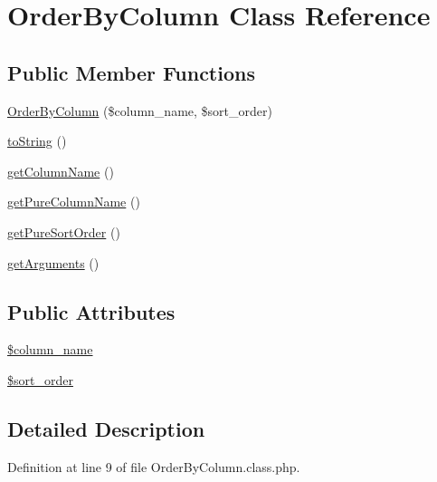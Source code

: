 \hypertarget{classOrderByColumn}{\section{Order\+By\+Column Class Reference}
\label{classOrderByColumn}
}
\subsection*{Public Member Functions}
\begin{DoxyCompactItemize}
\item 
\hyperlink{classOrderByColumn_a42a97dd505843873eb5cac1ea67e85a1}{Order\+By\+Column} (\$column\+\_\+name, \$sort\+\_\+order)
\item 
\hyperlink{classOrderByColumn_a6db0b86d7ed8ac3a9467ad9c2b70a022}{to\+String} ()
\item 
\hyperlink{classOrderByColumn_aa6e094dc084a79fa96a6cc529ac4431f}{get\+Column\+Name} ()
\item 
\hyperlink{classOrderByColumn_a11d8fa0bb15e4089d6cedde469f51aa7}{get\+Pure\+Column\+Name} ()
\item 
\hyperlink{classOrderByColumn_a7279ca2da1f1376de633eef931ff86ff}{get\+Pure\+Sort\+Order} ()
\item 
\hyperlink{classOrderByColumn_affbf2de8abb67fedf4fac695a2824392}{get\+Arguments} ()
\end{DoxyCompactItemize}
\subsection*{Public Attributes}
\begin{DoxyCompactItemize}
\item 
\hyperlink{classOrderByColumn_a4c1243e9acca95ecc01d0a37856be6e1}{\$column\+\_\+name}
\item 
\hyperlink{classOrderByColumn_ad62eb7e1435d62f643135df8094efba5}{\$sort\+\_\+order}
\end{DoxyCompactItemize}


\subsection{Detailed Description}


Definition at line 9 of file Order\+By\+Column.\+class.\+php.



